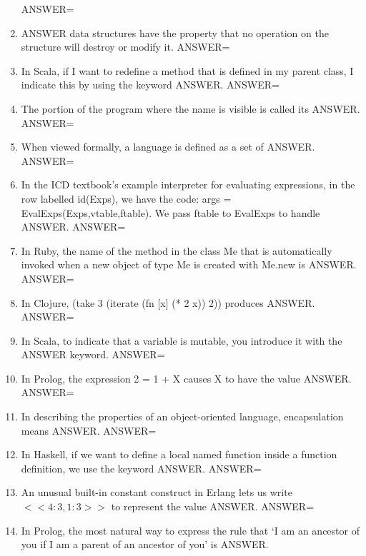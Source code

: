 \documentclass{exam}
\begin{document}
\begin{enumerate}
ANSWER=
\item ANSWER data structures have the property that no operation on the structure will destroy or modify it.\newline
ANSWER=
\item In Scala, if I want to redefine a method that is defined in my parent class, I indicate this by using the keyword ANSWER.\newline
ANSWER=
\item The portion of the program where the name is visible is called its ANSWER.\newline
ANSWER=
\item When viewed formally, a language is defined as a set of ANSWER.\newline
ANSWER=
\item In the ICD textbook's example interpreter for evaluating expressions, in the row labelled id(Exps), we have the code: args = EvalExps(Exps,vtable,ftable).  We pass ftable to EvalExps to handle ANSWER.\newline
ANSWER=
\item In Ruby, the name of the method in the class Me that is automatically invoked when a new object of type Me is created with Me.new is ANSWER.\newline
ANSWER=
\item In Clojure, (take 3 (iterate (fn $\lbrack$x$\rbrack$ (* 2 x)) 2)) produces ANSWER.\newline
ANSWER=
\item In Scala, to indicate that a variable is mutable, you introduce it with the ANSWER keyword.\newline
ANSWER=
\item In Prolog, the expression 2 = 1 + X causes X to have the value ANSWER.\newline
ANSWER=
\item In describing the properties of an object-oriented language, encapsulation means ANSWER.\newline
ANSWER=
\item In Haskell, if we want to define a local named function inside a function definition, we use the keyword ANSWER.\newline
ANSWER=
\item An unusual built-in constant construct in Erlang lets us write $<<4:3,1:3>>$ to represent the value ANSWER.\newline
ANSWER=
\item In Prolog, the most natural way to express the rule that `I am an ancestor of you if I am a parent of an ancestor of you' is ANSWER.\newline

\end{enumerate}
\end{document}
